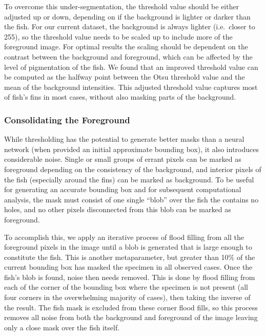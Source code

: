 \documentclass[conference]{IEEEtran}
\begin{document}
To overcome this under-segmentation, the threshold value should be
either adjusted up or down, depending on if the background is lighter or darker than the fish.
For our current dataset, the background is always lighter (i.e.~closer to 255), so the threshold value needs to be scaled up to include more of the
foreground image.
For optimal results the scaling should be dependent on the
contrast between the background and foreground,
which can be affected by
the level of pigmentation of the fish.
We found that an improved threshold value can be computed as the halfway
point between the Otsu threshold value and the
mean of the background intensities.
This adjusted threshold value
captures most of fish's fins in most cases, without also masking parts of the background.

\subsubsection{Consolidating the Foreground}
While thresholding has the potential to generate better masks than a neural network (when provided an initial approximate bounding box), it also introduces considerable noise. Single or small groups of errant pixels can be marked as foreground depending on the consistency of the background, and interior pixels of the fish (especially around the fins) can be marked as background. To be useful for generating an accurate bounding box and for subsequent computational analysis, the mask must consist of one single ``blob'' over the fish the contains no holes, and no other pixels disconnected from this blob can be marked as foreground.

To accomplish this, we apply an iterative process of flood filling from all the foreground pixels in the image until a blob is generated that is large enough to constitute the fish. This is another metaparameter, but greater than 10\% of the current bounding box has masked the specimen in all observed cases. Once the fish's blob is found, noise then needs removed. This is done by flood filling from each of the corner of the bounding box where the specimen is not present (all four corners in the overwhelming majority of cases), then taking the inverse of the result. The fish mask is excluded from these corner flood fills, so this process removes all noise from both the background and foreground of the image leaving only a close mask over the fish itself.
\end{document}
